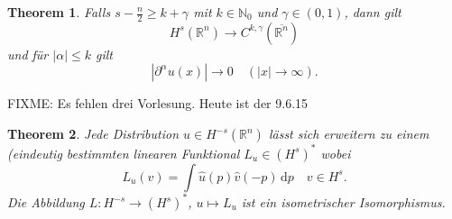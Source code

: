 \documentclass[
paper=a4,
bibtotocnumbered,
liststotocnumbered,
tablecaptionabove,
pointlessnumbers,
twoside,
openright,
10pt
]
{report}
\newtheorem{thm}{Theorem}[chapter]
\theoremstyle{definition}
\numberwithin{equation}{chapter}
\begin{document}
\begin{thm}
Falls $s- \frac{n}{2}\ge k +\gamma$ mit $k\in \mathbb N_0$ und $\gamma \in (0,1)$, dann gilt
\begin{equation}
H^s(\mathbb R^n) \to C^{k,\gamma}(\overline{\mathbb R^n})
\end{equation}
und für $|\alpha|\le k$ gilt
\begin{equation}
|\partial^\alpha u(x)|\to 0 \quad (|x|\to \infty).
\end{equation}
\end{thm}

FIXME: Es fehlen drei Vorlesung. Heute ist der 9.6.15
\setcounter{thm}{5}
\begin{thm}\label{6.6}
Jede Distribution $u\in H^{-s}(\mathbb R^n)$ lässt sich erweitern zu einem (eindeutig bestimmten linearen Funktional $L_u \in (H^s)^*$ wobei 
\begin{equation}
L_u(v) = \int \hat u(p) \hat v(-p)\, \mathrm dp \quad v\in H^s.
\end{equation}
Die Abbildung $L: H^{-s}\to (H^s)^*$, $u\mapsto L_u$ ist ein isometrischer Isomorphismus. 
\end{thm}
\end{document}

